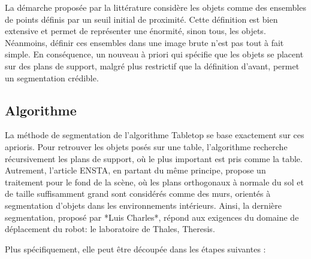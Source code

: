 La démarche proposée par la littérature considère les objets comme des
ensembles de points définis par un seuil initial de proximité. Cette
définition est bien extensive et permet de représenter une énormité,
sinon tous, les objets. Néanmoins, définir ces ensembles dans une
image brute n'est pas tout à fait simple. En conséquence, un nouveau à
priori qui spécifie que les objets se placent sur des plans de
support, malgré plus restrictif que la définition d'avant, permet un
segmentation crédible.

\subsection{Algorithme}

La méthode de segmentation de l’algorithme Tabletop
se base exactement sur ces aprioris. Pour retrouver les objets posés
sur une table, l'algorithme recherche récursivement les plans de
support, où le plus important est pris comme la table. Autrement,
l'article {\color{blue}ENSTA}, en partant du même principe, propose un
traitement pour le fond de la scène, où les plans orthogonaux à
normale du sol et de taille suffisamment grand sont considérés comme
des murs, orientés à segmentation d'objets dans les environnements
intérieurs. Ainsi, la dernière segmentation, proposé par *Luis
Charles*, répond aux exigences du domaine de déplacement du robot: le
laboratoire de Thales, Theresis.

Plus spécifiquement, elle peut être découpée dans les étapes suivantes
:

